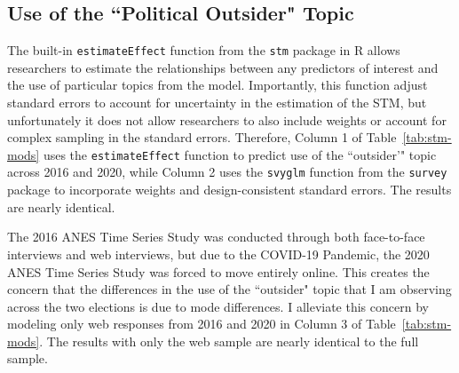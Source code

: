 \documentclass[12pt]{article}
\begin{document}
\begin{appendices}
\begin{refsection}
\clearpage
\subsection{Use of the ``Political Outsider" Topic}\label{si:stm-mods}
The built-in \texttt{estimateEffect} function from the \texttt{stm} package in R allows researchers to estimate the relationships between any predictors of interest and the use of particular topics from the model. Importantly, this function adjust standard errors to account for uncertainty in the estimation of the STM, but unfortunately it does not allow researchers to also include weights or account for complex sampling in the standard errors. Therefore, Column 1 of Table~\ref{tab:stm-mods} uses the \texttt{estimateEffect} function to predict use of the ``outsider'" topic across 2016 and 2020, while Column 2 uses the \texttt{svyglm} function from the \texttt{survey} package to incorporate weights and design-consistent standard errors.  The results are nearly identical. 

The 2016 ANES Time Series Study was conducted through both face-to-face interviews and web interviews, but due to the COVID-19 Pandemic, the 2020 ANES Time Series Study was forced to move entirely online. This creates the concern that the differences in the use of the ``outsider" topic that I am observing across the two elections is due to mode differences. I alleviate this concern by modeling only web responses from 2016 and 2020 in Column 3 of Table~\ref{tab:stm-mods}. The results with only the web sample are nearly identical to the full sample. 




\clearpage
\printbibliography
\end{refsection}
\end{appendices}
\end{document}
